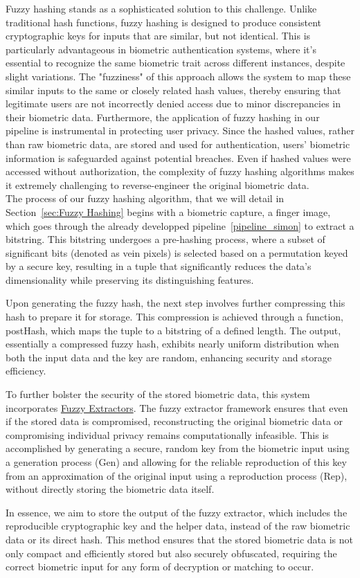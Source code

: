 Fuzzy hashing stands as a sophisticated solution to this challenge. Unlike traditional hash functions, fuzzy hashing is designed to produce consistent cryptographic keys for inputs that are similar, but not identical. This is particularly advantageous in biometric authentication systems, where it's essential to recognize the same biometric trait across different instances, despite slight variations. The "fuzziness" of this approach allows the system to map these similar inputs to the same or closely related hash values, thereby ensuring that legitimate users are not incorrectly denied access due to minor discrepancies in their biometric data.
Furthermore, the application of fuzzy hashing in our pipeline is instrumental in protecting user privacy. Since the hashed values, rather than raw biometric data, are stored and used for authentication, users' biometric information is safeguarded against potential breaches. Even if hashed values were accessed without authorization, the complexity of fuzzy hashing algorithms makes it extremely challenging to reverse-engineer the original biometric data.\\

The process of our fuzzy hashing algorithm, that we will detail in Section~\ref{sec:Fuzzy Hashing}  begins with a biometric capture, a finger image, which goes through the already developped pipeline~\ref{pipeline_simon} to extract a bitstring. This bitstring undergoes a pre-hashing process, where a subset of significant bits (denoted as vein pixels) is selected based on a permutation keyed by a secure key, resulting in a tuple that significantly reduces the data's dimensionality while preserving its distinguishing features.

Upon generating the fuzzy hash, the next step involves further compressing this hash to prepare it for storage. This compression is achieved through a function, postHash, which maps the tuple to a bitstring of a defined length. The output, essentially a compressed fuzzy hash, exhibits nearly uniform distribution when both the input data and the key are random, enhancing security and storage efficiency.

To further bolster the security of the stored biometric data, this system incorporates \hyperref[def:Fuzzy_Extractors]{Fuzzy Extractors}. The fuzzy extractor framework ensures that even if the stored data is compromised, reconstructing the original biometric data or compromising individual privacy remains computationally infeasible. This is accomplished by generating a secure, random key from the biometric input using a generation process (Gen) and allowing for the reliable reproduction of this key from an approximation of the original input using a reproduction process (Rep), without directly storing the biometric data itself.

In essence, we aim to store the output of the fuzzy extractor, which includes the reproducible cryptographic key and the helper data, instead of the raw biometric data or its direct hash. This method ensures that the stored biometric data is not only compact and efficiently stored but also securely obfuscated, requiring the correct biometric input for any form of decryption or matching to occur.

